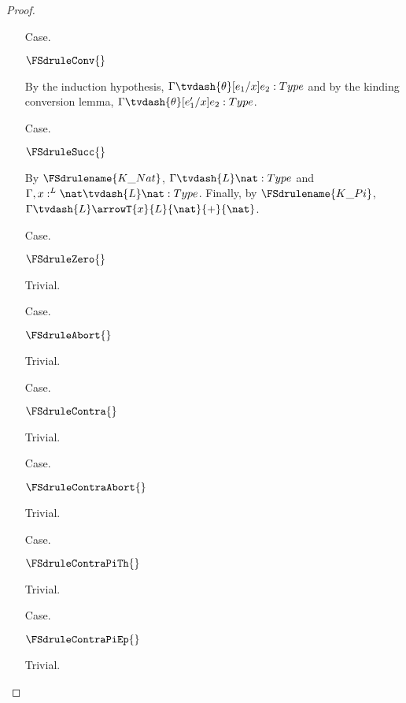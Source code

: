 \begin{proof}
\begin{itemize}
  \item[Case.] \ \\
    \begin{center}
      $\FSdruleConv{}$
    \end{center}
    By the induction hypothesis, $\Gamma \tvdash{\theta} [e_1/x]e_2:Type$ and by the kinding 
    conversion lemma, $\Gamma \tvdash{\theta} [e'_1/x]e_2:Type$.

  \item[Case.] \ \\
    \begin{center}
      $\FSdruleSucc{}$
    \end{center}
    By $\FSdrulename{K\_Nat}$, $\Gamma \tvdash{L} \nat:Type$ and 
    $\Gamma,x:^L \nat \tvdash{L} \nat:Type$.  Finally, by $\FSdrulename{K\_Pi}$,
    $\Gamma \tvdash{L} \arrowT{x}{L}{\nat}{+}{\nat}$.
    
    
  \item[Case.] \ \\
    \begin{center}
      $\FSdruleZero{}$
    \end{center}
    Trivial.

  \item[Case.] \ \\
    \begin{center}
      $\FSdruleAbort{}$  
    \end{center}
    Trivial.

  \item[Case.] \ \\
    \begin{center}
      $\FSdruleContra{}$
    \end{center}
    Trivial.

  \item[Case.] \ \\
    \begin{center}
      $\FSdruleContraAbort{}$
    \end{center}
    Trivial.

  \item[Case.] \ \\
    \begin{center}
      $\FSdruleContraPiTh{}$
    \end{center}
    Trivial.

  \item[Case.] \ \\
    \begin{center}
      $\FSdruleContraPiEp{}$
    \end{center}
    Trivial.


\end{itemize}
\end{proof}
